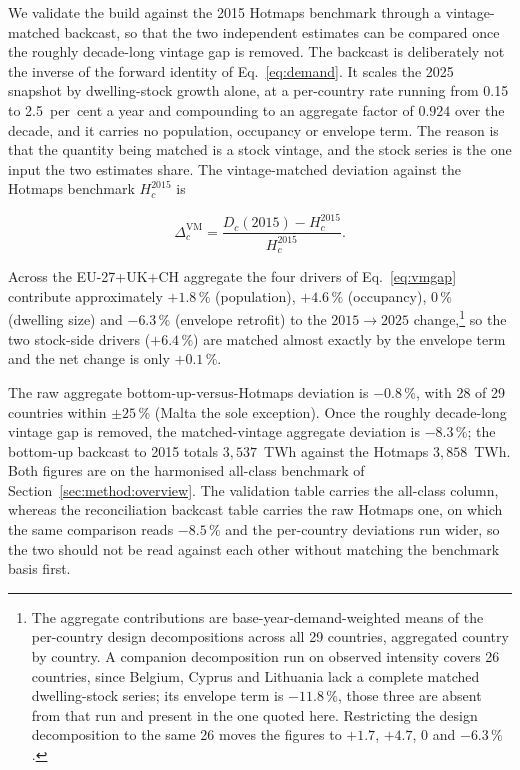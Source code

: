 We validate the build against the 2015 Hotmaps benchmark through a vintage-matched
backcast, so that the two independent estimates can be compared once the roughly
decade-long vintage gap is removed. The backcast is deliberately not the inverse of the
forward identity of Eq.~\eqref{eq:demand}. It scales the 2025 snapshot by dwelling-stock
growth alone, at a per-country rate running from 0.15 to 2.5~per~cent a year and
compounding to an aggregate factor of $0.924$ over the decade, and it carries no
population, occupancy or envelope term. The reason is that the quantity being matched is a stock vintage, and the stock series is the one input the
two estimates share. The
vintage-matched deviation against the Hotmaps benchmark $H_c^{2015}$ is

\begin{equation}
 \Delta_c^{\mathrm{VM}} = \frac{D_c(2015) - H_c^{2015}}{H_c^{2015}}.
 \label{eq:vmgap}
\end{equation}

\noindent Across the EU-27+UK+CH aggregate the four drivers of Eq.~\eqref{eq:vmgap} contribute
approximately $+1.8\,\%$ (population), $+4.6\,\%$ (occupancy), $0\,\%$ (dwelling size)
and $-6.3\,\%$ (envelope retrofit) to the $2015\to2025$ change,\footnote{The aggregate
contributions are base-year-demand-weighted means of the per-country design
decompositions across all 29 countries, aggregated country by country. A companion
decomposition run on observed intensity covers 26 countries, since Belgium,
Cyprus and Lithuania lack a complete matched dwelling-stock series; its envelope term is
$-11.8\,\%$, those three are absent from that run and present in the one quoted here.
Restricting the design decomposition to the same 26 moves the figures to $+1.7$, $+4.7$,
$0$ and $-6.3\,\%$.} so the two stock-side drivers ($+6.4\,\%$) are matched almost exactly by the envelope term and the net change is only $+0.1\,\%$.

The raw aggregate bottom-up-versus-Hotmaps deviation is $-0.8\,\%$, with 28 of 29
countries within $\pm 25\,\%$ (Malta the sole exception). Once the roughly decade-long
vintage gap is removed, the matched-vintage aggregate deviation is $-8.3\,\%$; the
bottom-up backcast to 2015 totals $3{,}537$~TWh against the Hotmaps $3{,}858$~TWh. Both
figures are on the harmonised all-class benchmark of Section~\ref{sec:method:overview}.
The validation table carries the all-class column, whereas the reconciliation backcast
table carries the raw Hotmaps one, on which the same comparison reads $-8.5\,\%$ and the
per-country deviations run wider,
so the two should not be read against each other without matching the benchmark basis
first.

